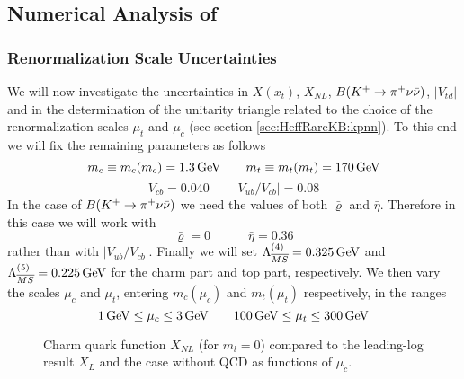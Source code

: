 \subsection{Numerical Analysis of \kpnn}
\label{sec:Kpnn:NumericalKp}
\subsubsection{Renormalization Scale Uncertainties}
\label{sec:Kpnn:NumericalKp:RSU}
We will now investigate the uncertainties in $X(x_t)$, $X_{NL}$,
$B(K^+ \to \pi^+\nu\bar\nu)$, $|V_{td}|$ and in the determination of the unitarity
triangle related to the choice of the renormalization scales $\mu_t$
and $\mu_c$ (see section \ref{sec:HeffRareKB:kpnn}). To this end we
will fix the remaining parameters as follows
\begin{equation}\label{mcmtnum}
m_c\equiv m_c(m_c)=1.3\, {\rm GeV} \qquad m_t\equiv m_t(m_t)=170\, {\rm GeV}
\end{equation}
\begin{equation}\label{vcbubnum}
V_{cb}=0.040 \qquad |V_{ub}/V_{cb}|=0.08
\end{equation}
In the case of $B(K^+ \to \pi^+\nu\bar\nu)$ we need the values of both $\bar\varrho$
and $\bar\eta$. Therefore in this case we will work with
\begin{equation}\label{rhetnum}
\bar\varrho=0 \qquad\quad  \bar\eta=0.36
\end{equation}
rather than with $|V_{ub}/V_{cb}|$. Finally we will set
$\Lambda_{\overline{MS}}^{(4)}=0.325\, {\rm GeV}$ and
$\Lambda_{\overline{MS}}^{(5)}=0.225\, {\rm GeV}$ for the charm part and top
part, respectively.
We then vary the scales $\mu_c$ and $\mu_t$, entering $m_c(\mu_c)$
and $m_t(\mu_t)$ respectively, in the ranges
\begin{equation}\label{muctnum}
1\, {\rm GeV}\leq\mu_c\leq 3\, {\rm GeV} \qquad 100\, {\rm GeV}\leq\mu_t\leq 300\, {\rm GeV}
\end{equation}

\begin{figure}[hbt]
\vspace{0.10in}
\centerline{
\epsfysize=5in
 }
\vspace{0.08in}
\caption[]{
Charm quark function $X_{NL}$ (for $m_l=0$) compared to the leading-log
result $X_L$ and the case without QCD as functions of $\mu_c$.
\label{fig:kpnunu:XNL}}
\end{figure}

